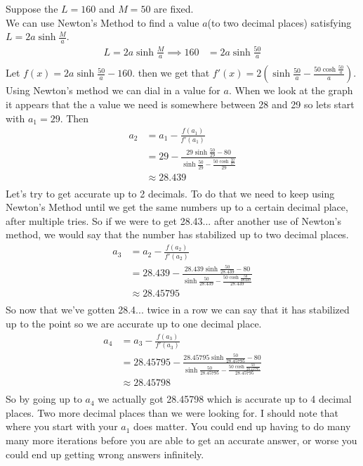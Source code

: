 \documentclass[12pt]{article}
\begin{document}
\noindent Suppose the $L = 160$ and $M = 50$ are fixed. \\
\indent We can use Newton's Method to find a value $a$(to two decimal places) satisfying $L = 2a\sinh{\frac{M}{a}}$.
\begin{align} \nonumber
L = 2a\sinh{\frac{M}{a}} \implies 160 &= 2a\sinh{\frac{50}{a}} \\ \nonumber 
\end{align}
Let $f(x) = 2a\sinh{\frac{50}{a}} - 160$. then we get that $f'(x) = 2\left( \sinh{\frac{50}{a}} - \frac{50\cosh{\frac{50}{a}}}{a} \right)$.
Using Newton's method we can dial in a value for $a$. When we look at the graph it appears that the a value we need is somewhere between 28 and 29 so lets start with $a_1 = 29$. Then
\begin{align} \nonumber
a_2 &= a_1 - \frac{f(a_1)}{f'(a_1)} \\ \nonumber
&= 29 - \frac{29\sinh{\frac{50}{29}} - 80}{\sinh{\frac{50}{29}} - \frac{50\cosh{\frac{50}{29}}}{29}}\\ \nonumber
&\approx 28.439 \\ \nonumber
\end{align}
Let's try to get accurate up to 2 decimals. To do that we need to keep using Newton's Method until we get the same numbers up to a certain decimal place, after multiple tries. So if we were to get 28.43... after another use of Newton's method, we would say that the number has stabilized up to two decimal places.
\begin{align} \nonumber
a_3 &= a_2 - \frac{f(a_2)}{f'(a_2)} \\ \nonumber
&= 28.439 - \frac{28.439\sinh{\frac{50}{28.439}} - 80}{\sinh{\frac{50}{28.439}} - \frac{50\cosh{\frac{50}{28.439}}}{28.439}}\\ \nonumber
&\approx 28.45795 \\ \nonumber
\end{align}
So now that we've gotten 28.4... twice in a row we can say that it has stabilized up to the point so we are accurate up to one decimal place.
\begin{align} \nonumber
a_4 &= a_3 - \frac{f(a_3)}{f'(a_3)} \\ \nonumber
&= 28.45795 - \frac{28.45795\sinh{\frac{50}{28.45795}} - 80}{\sinh{\frac{50}{28.45795}} - \frac{50\cosh{\frac{50}{28.45795}}}{28.45795}}\\ \nonumber
&\approx 28.45798 \\ \nonumber
\end{align}
So by going up to $a_4$ we actually got 28.45798 which is accurate up to 4 decimal places. Two more decimal places than we were looking for. I should note that where you start with your $a_1$ does matter. You could end up having to do many many more iterations before you are able to get an accurate answer, or worse you could end up getting wrong answers infinitely.
\end{document}
